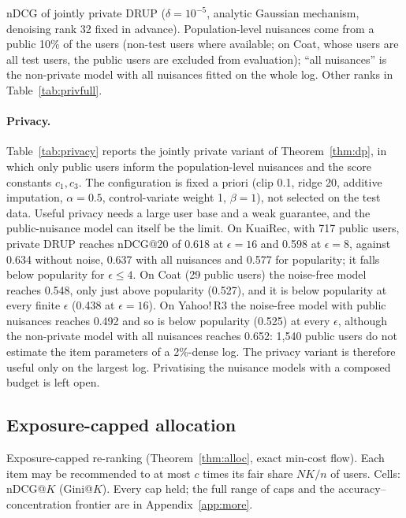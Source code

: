 \begin{table}[t]\centering\small
\caption{nDCG of jointly private DRUP ($\delta=10^{-5}$, analytic Gaussian mechanism,
denoising rank 32 fixed in advance). Population-level nuisances come from a
public 10\% of the users (non-test users where available; on Coat, whose
users are all test users, the public users are excluded from evaluation); ``all nuisances'' is the non-private model
with all nuisances fitted on the whole log. Other ranks in
Table~\ref{tab:privfull}.}\label{tab:privacy}
\begin{adjustbox}{max width=\textwidth}

\end{adjustbox}
\end{table}

\paragraph{Privacy.} Table~\ref{tab:privacy} reports the jointly private variant of
Theorem~\ref{thm:dp}, in which only public users inform the population-level
nuisances and the score constants $c_1,c_3$. The configuration is fixed a
priori (clip 0.1, ridge 20, additive imputation, $\alpha=0.5$, control-variate
weight 1, $\beta=1$), not selected on the test data. Useful privacy needs a large
user base and a weak guarantee, and the public-nuisance model can itself be the
limit. On KuaiRec, with 717 public users, private DRUP reaches nDCG@20 of 0.618
at $\epsilon=16$ and 0.598 at $\epsilon=8$, against 0.634 without noise, 0.637
with all nuisances and 0.577 for popularity; it falls below popularity for
$\epsilon\le4$. On Coat (29 public users) the noise-free model reaches 0.548,
only just above popularity (0.527), and it is below popularity at every finite
$\epsilon$ (0.438 at $\epsilon=16$). On Yahoo!\,R3 the noise-free model with
public nuisances reaches 0.492 and so is below popularity (0.525) at every
$\epsilon$, although the non-private model with all nuisances reaches 0.652:
1{,}540 public users do not estimate the item parameters of a 2\%-dense log. The
privacy variant is therefore useful only on the largest log. Privatising the
nuisance models with a composed budget is left open.

\subsection{Exposure-capped allocation}\label{sec:rerank}

\begin{table}[t]\centering\small
\caption{Exposure-capped re-ranking (Theorem~\ref{thm:alloc}, exact min-cost flow).
Each item may be recommended to at most $c$ times its fair share $NK/n$ of users.
Cells: nDCG@$K$ (Gini@$K$). Every cap held; the full range of caps and the
accuracy--concentration frontier are in Appendix~\ref{app:more}.}\label{tab:rerank}
\begin{adjustbox}{max width=\textwidth}

\end{adjustbox}
\end{table}



